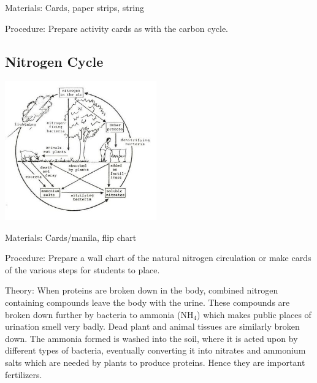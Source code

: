 \begin{multicols}{2}
\begin{description*}
\item[Materials:]{Cards, paper strips, string}
\item[Procedure:]{Prepare activity cards as with the carbon cycle.}
\end{description*}

\subsection{Nitrogen Cycle}  

\begin{center}
\includegraphics[width=0.49\textwidth]{./img/source/nitrogen-cycle.jpg}
\end{center}

\begin{description*}
\item[Materials:]{Cards/manila, flip chart}
\item[Procedure:]{Prepare a wall chart of the natural nitrogen
circulation or make cards of the various steps for students to place. }
\item[Theory:]{When proteins are broken down in
the body, combined nitrogen containing
compounds leave the body with the urine. These
compounds are broken down further by bacteria
to ammonia (NH$_4$) which makes
public places of urination smell very badly.
Dead plant and animal tissues are similarly
broken down. The ammonia formed is washed
into the soil, where it is acted upon by different
types of bacteria, eventually converting it into
nitrates and ammonium salts which are needed
by plants to produce proteins. Hence they are
important fertilizers.}
\end{description*}


\end{multicols}
